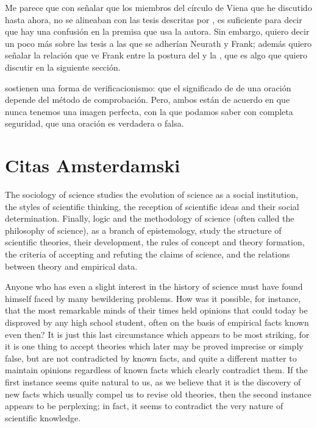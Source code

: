 Me parece que con señalar que los miembros del círculo de Viena que he discutido hasta ahora, no se alineaban con las tesis descritas por \parencite{Yturbe1995}, es suficiente para decir que hay una confusión en la premisa que usa la autora.
Sin embargo, quiero decir un poco más sobre las tesis a las que se adherían Neurath y Frank; además quiero señalar la relación que ve Frank entre la postura del  y la , que es algo que quiero discutir en la siguiente sección.

 sostienen una forma de verificacionismo: que el significado de de una oración depende del método de comprobación.
Pero, ambos están de acuerdo en que nunca tenemos una imagen perfecta, con la que podamos saber con completa seguridad, que una oración es verdadera o falsa.



\section{Citas Amsterdamski}

The sociology of science studies the evolution of science as a  social institution, the styles of scientific thinking, the reception of scientific  ideas and their social determination. Finally, logic and the methodology  of science (often called the philosophy of science), as a branch of epistemology, study the structure of scientific theories, their development, the  rules of concept and theory formation, the criteria of accepting and  refuting the claims of science, and the relations between theory and  empirical data.

Anyone who has even a slight interest in the history of science must have  found himself faced by many bewildering problems. How was it possible,  for instance, that the most remarkable minds of their times held opinions  that could today be disproved by any high school student, often on the  basis of empirical facts known even then? It is just this last circumstance  which appears to be most striking, for it is one thing to accept theories  which later may be proved imprecise or simply false, but are not contradicted by known facts, and quite a different matter to maintain opinions regardless of known facts which clearly contradict them. If the first  instance seems quite natural to us, as we believe that it is the discovery of  new facts which usually compel us to revise old theories, then the second  instance appears to be perplexing; in fact, it seems to contradict the very  nature of scientific knowledge.

